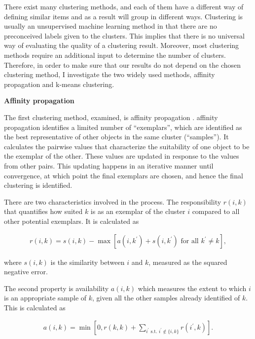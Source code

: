 \documentclass[a4paper,12pt]{article}
\begin{document}
There exist many clustering methods, and each of them have a different way of defining similar items and as a result will group in different ways. Clustering is usually an unsupervised machine learning method in that there are no preconceived labels given to the clusters. This implies that there is no universal way of evaluating the quality of a clustering result. Moreover, most clustering methods require an additional input to determine the number of clusters.  Therefore, in order to make sure that our results do not depend on the chosen clustering method, I investigate the two widely used methods, affinity propagation and k-means clustering.

\textbf{Affinity propagation}

The first clustering method, examined, is affinity propagation \citep{freyDueck07}. affinity propagation identifies a limited number of ``exemplars'', which are identified as the best representative of other objects in the same cluster (``samples''). It calculates the pairwise values that characterize the suitability of one object to be the exemplar of the other. These values are updated in response to the values from other pairs. This updating happens in an iterative manner until convergence, at which point the final exemplars are chosen, and hence the final clustering is identified.

There are two characteristics involved in the process. The responsibility $r\left(i,k\right)$ that quantifies how suited $k$ is as an exemplar of the cluster $i$ compared to all other potential exemplars. It is calculated as

\begin{align}\label{eq:affinityPropagationExemplars}
    r\left(i,k\right) = s\left(i,k\right) - \max\left[a\left(i,k^\prime\right) + s\left(i,k^\prime\right) \text{ for all } k^\prime \neq k\right],
\end{align}

where $s\left(i,k\right)$ is the similarity between $i$ and $k$, measured as the squared negative error.

The second property is availability $a\left(i,k\right)$ which measures the extent to which $i$ is an appropriate sample of $k$, given all the other samples already identified of $k$. This is calculated as

\begin{align}\label{eq:availabilityAffinityPropagation}
    a\left(i,k\right) = \min\left[0, r\left(k,k\right) + \sum_{i^\prime \text{ s.t. } i^\prime \notin \{i,k\}} r\left(i^\prime,k\right)\right].
\end{align}
\end{document}
